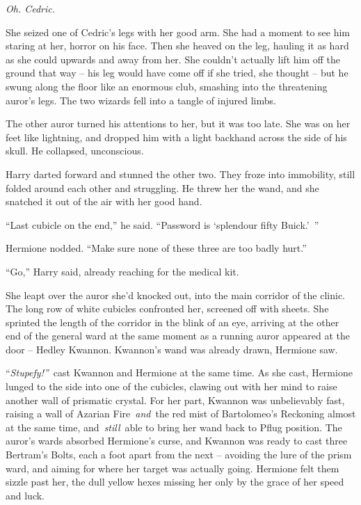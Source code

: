 \emph{Oh. Cedric.}

She seized one of Cedric's legs with her good arm. She had a moment to
see him staring at her, horror on his face. Then she heaved on the leg,
hauling it as hard as she could upwards and away from her. She couldn't
actually lift him off the ground that way -- his leg would have come off
if she tried, she thought -- but he swung along the floor like an
enormous club, smashing into the threatening auror's legs. The two
wizards fell into a tangle of injured limbs.

The other auror turned his attentions to her, but it was too late. She
was on her feet like lightning, and dropped him with a light backhand
across the side of his skull. He collapsed, unconscious.

Harry darted forward and stunned the other two. They froze into
immobility, still folded around each other and struggling. He threw her
the wand, and she snatched it out of the air with her good hand.

``Last cubicle on the end,'' he said. ``Password is `splendour fifty
Buick.'~''

Hermione nodded. ``Make sure none of these three are too badly hurt.''

``Go,'' Harry said, already reaching for the medical kit.

She leapt over the auror she'd knocked out, into the main corridor of
the clinic. The long row of white cubicles confronted her, screened off
with sheets. She sprinted the length of the corridor in the blink of an
eye, arriving at the other end of the general ward at the same moment as
a running auror appeared at the door -- Hedley Kwannon. Kwannon's wand
was already drawn, Hermione saw.

``\emph{Stupefy!''}~cast Kwannon and Hermione at the same time. As she
cast, Hermione lunged to the side into one of the cubicles, clawing out
with her mind to raise another wall of prismatic crystal. For her part,
Kwannon was unbelievably fast, raising a wall of Azarian
Fire~\emph{and}~the red mist of Bartolomeo's Reckoning almost at the
same time, and~\emph{still}~able to bring her wand back to Pflug
position. The auror's wards absorbed Hermione's curse, and Kwannon was
ready to cast three Bertram's Bolts, each a foot apart from the next --
avoiding the lure of the prism ward, and aiming for where her target was
actually going. Hermione felt them sizzle past her, the dull yellow
hexes missing her only by the grace of her speed and luck.

